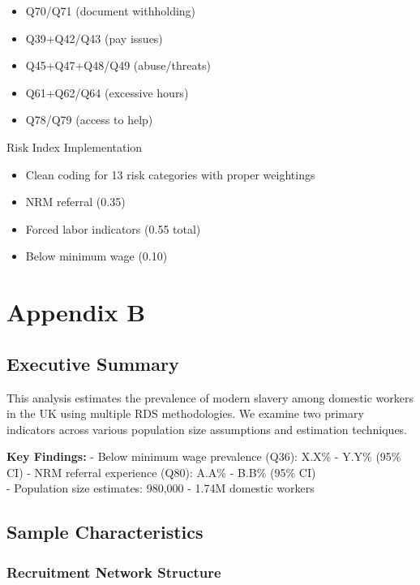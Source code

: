\documentclass[
  12pt,
  letterpaper,
  DIV=11,
  numbers=noendperiod]{scrartcl}
\providecommand{\tightlist}{%
  \setlength{\itemsep}{0pt}\setlength{\parskip}{0pt}}
\theoremstyle{plain}
\theoremstyle{definition}
\begin{document}
\begin{itemize}
\tightlist
\item
  Q70/Q71 (document withholding)
\item
  Q39+Q42/Q43 (pay issues)
\item
  Q45+Q47+Q48/Q49 (abuse/threats)
\item
  Q61+Q62/Q64 (excessive hours)
\item
  Q78/Q79 (access to help)
\end{itemize}

Risk Index Implementation

\begin{itemize}
\tightlist
\item
  Clean coding for 13 risk categories with proper weightings
\item
  NRM referral (0.35)
\item
  Forced labor indicators (0.55 total)
\item
  Below minimum wage (0.10)
\end{itemize}

\section{Appendix B}\label{app-b}

\subsection{Executive Summary}\label{executive-summary}

This analysis estimates the prevalence of modern slavery among domestic
workers in the UK using multiple RDS methodologies. We examine two
primary indicators across various population size assumptions and
estimation techniques.

\textbf{Key Findings:} - Below minimum wage prevalence (Q36): X.X\% -
Y.Y\% (95\% CI) - NRM referral experience (Q80): A.A\% - B.B\% (95\%
CI)\\
- Population size estimates: 980,000 - 1.74M domestic workers

\subsection{Sample Characteristics}\label{sample-characteristics}

\subsubsection{Recruitment Network
Structure}\label{recruitment-network-structure}
\end{document}
